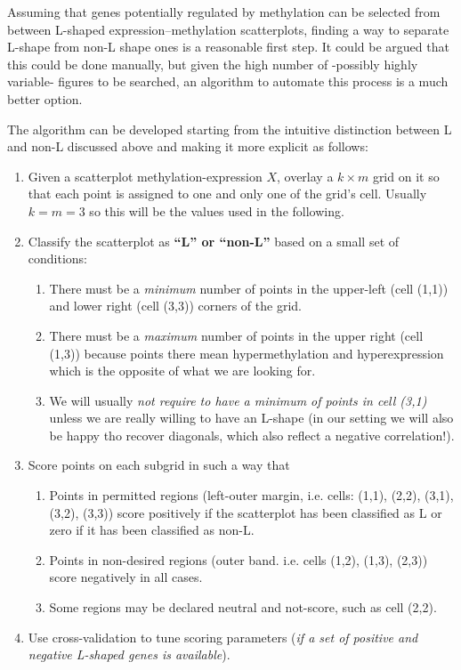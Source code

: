 \documentclass[10pt,letterpaper]{article}
\begin{document}
Assuming that genes potentially regulated by methylation can be selected
from between L-shaped expression--methylation scatterplots, finding a
way to separate L-shape from non-L shape ones is a reasonable first
step. It could be argued that this could be done manually, but given the
high number of -possibly highly variable- figures to be searched, an
algorithm to automate this process is a much better option.

The algorithm can be developed starting from the intuitive distinction
between L and non-L discussed above and making it more explicit as
follows:

\begin{enumerate}
\item Given a scatterplot methylation-expression $X$, overlay a $k\times m$ grid on it so that each point is assigned to one and only one of the grid's cell. Usually $k=m=3$ so this will be the values used in the following.
\item Classify the scatterplot as \textbf{``L'' or ``non-L''} based on a small set of conditions:
\begin{enumerate}
  \item There must be a \emph{minimum} number of points in the upper-left (cell (1,1)) and lower right (cell (3,3)) corners of the grid.
  \item There must be a \emph{maximum} number of points in the upper right (cell (1,3)) because points there mean hypermethylation and hyperexpression which is the opposite of what we are looking for.
  \item We will usually \emph{not require to have a minimum of points in cell (3,1)} unless we are really willing to have an L-shape (in our setting we will also be happy tho recover diagonals, which also reflect a negative correlation!).
\end{enumerate}
\item Score points on each subgrid in such a way that
\begin{enumerate}
    \item Points in permitted regions (left-outer margin, i.e. cells: (1,1), (2,2), (3,1), (3,2), (3,3)) score positively if the scatterplot has been classified as L or zero if it has been classified as non-L.
    \item Points in non-desired regions (outer band. i.e. cells (1,2), (1,3), (2,3)) score negatively in all cases.
    \item Some regions may be declared neutral and not-score, such as cell (2,2).
\end{enumerate}
\item Use cross-validation to tune scoring parameters (\textit{if a set of positive and negative L-shaped genes is available}). 
\end{enumerate}
\end{document}
